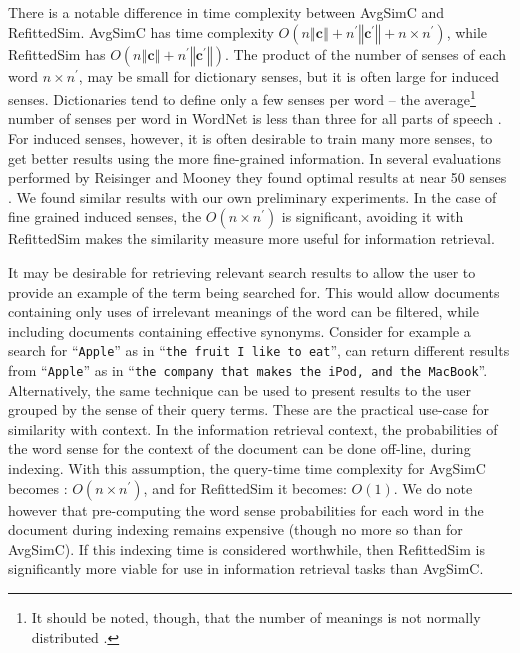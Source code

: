 \documentclass{sig-alternate}
\renewcommand{\c}{\mathbf{c}}
\newcommand{\wordquote}[1]{\enquote{\texttt{#1}}}
\begin{document}
There is a notable difference in time complexity between AvgSimC and RefittedSim.
AvgSimC has time complexity $O(n\left\Vert \c\right\Vert +n^{\prime}\left\Vert \c^{\prime}\right\Vert +n\times n^{\prime})$,
while RefittedSim has $O(n\left\Vert \c\right\Vert +n^{\prime}\left\Vert \c^{\prime}\right\Vert)$.
The product of the number of senses of each word $n \times n^\prime$, may be small for dictionary senses, but it is often large for induced senses. Dictionaries tend to define only a few senses per word -- the average\footnote{It should be noted, though, that the number of meanings is not normally distributed \parencite{zipf1945meaning}.} number of senses per word in WordNet is less than three for all parts of speech \parencite{miller1995wordnet}. For induced senses, however, it is often desirable to train many more senses, to get better results using the more fine-grained information. In several evaluations performed by Reisinger and Mooney they found optimal results at near 50 senses \parencite{Reisinger2010}. We found similar results with our own preliminary experiments.
In the case of fine grained induced senses, the $O(n \times n^\prime)$ is significant, avoiding it with RefittedSim makes the similarity measure more useful for information retrieval.

It may be desirable for retrieving relevant search results to allow the user to provide an example of the term being searched for. This would allow documents containing only uses of irrelevant meanings of the word can be filtered, while  including documents containing effective synonyms. Consider for example a search for \wordquote{Apple} as in \wordquote{the fruit I like to eat}, can return different results from \wordquote{Apple} as in \wordquote{the company that makes the iPod, and the MacBook}. 
Alternatively, the same technique can be used to present results to the user grouped by the sense of their query terms.
These are the practical use-case for similarity with context.
In the information retrieval context, the probabilities of the word sense for the context of the document can be done off-line, during indexing. With this assumption, the query-time time complexity for AvgSimC becomes : $O(n\times n^{\prime})$, and for RefittedSim it becomes: $O(1)$.
We do note however that pre-computing the word sense probabilities for each word in the document during indexing remains expensive (though no more so than for AvgSimC). If this indexing time is considered worthwhile, then RefittedSim is significantly more viable for use in information retrieval tasks than AvgSimC.
\end{document}
